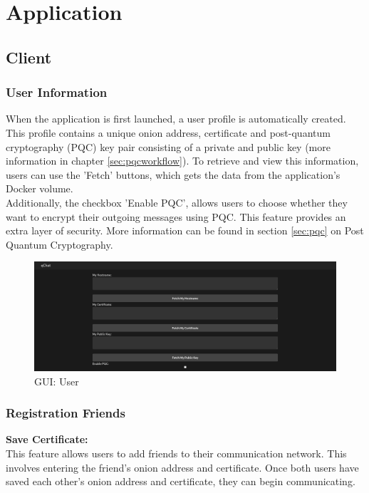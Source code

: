 \chapter{Application}
\section {Client}

\subsection{User Information}

When the application is first launched, a user profile is automatically created. This profile contains a unique onion address, certificate and post-quantum cryptography (PQC) key pair consisting of a private and public key (more information in chapter \ref{sec:pqcworkflow}). To retrieve and view this information, users can use the 'Fetch' buttons, which gets the data from the application's Docker volume.\\

Additionally, the checkbox 'Enable PQC', allows users to choose whether they want to encrypt their outgoing messages using PQC. This feature provides an extra layer of security. More information can be found in section \ref{sec:pqc} on Post Quantum Cryptography.



\begin{figure}[H]
    \centering
    \includegraphics[width=1\linewidth]{resources/client/OwnUserCertKey.png}
    \caption{GUI: User}
    \label{fig:ownUser}
\end{figure}



\subsection{Registration Friends}

\textbf{Save Certificate:}\\
This feature allows users to add friends to their communication network. This involves entering the friend's onion address and certificate. Once both users have saved each other's onion address and certificate, they can begin communicating.\\

